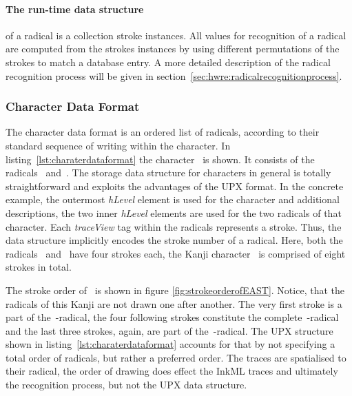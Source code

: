 \paragraph{The run-time data structure} of a radical is a collection stroke instances.
All values for recognition of a radical are computed from the strokes instances
by using different permutations of the strokes to match a database entry. A more
detailed description of the radical recognition process will be given in
section~\ref{sec:hwre:radicalrecognitionprocess}.

\subsubsection{Character Data Format}
\label{sec:hwre:characterdataformat}

The character data format is an ordered list of radicals, according to their
standard sequence of writing within the character. In 
listing~\ref{lst:charaterdataformat} the character~ is shown.
It consists of the radicals~ and~. The storage data structure 
for characters in general is totally straightforward and exploits the 
advantages of the UPX format.
In the concrete example, the outermost \emph{hLevel} element is used for the 
character and additional descriptions, the two inner \emph{hLevel} elements are 
used for the two radicals of that character. Each \emph{traceView} tag within 
the radicals represents a stroke. Thus, the data structure implicitly encodes
the stroke number of a radical. Here, both the radicals~ and~
have four strokes each, the Kanji character~ is comprised of 
eight strokes in total.

The stroke order of~ is shown in figure \ref{fig:strokeorderofEAST}.
Notice, that the radicals of this Kanji are not drawn one after another.
The very first stroke is a part of the~-radical, the four following
strokes constitute the complete~-radical and the last three strokes,
again, are part of the~-radical.
The UPX structure shown in listing~\ref{lst:charaterdataformat} accounts for
that by not specifying a total order of radicals, but rather a preferred order.
The traces are spatialised to their radical, the order of drawing does effect
the InkML traces and ultimately the recognition process, 
but not the UPX data structure.

